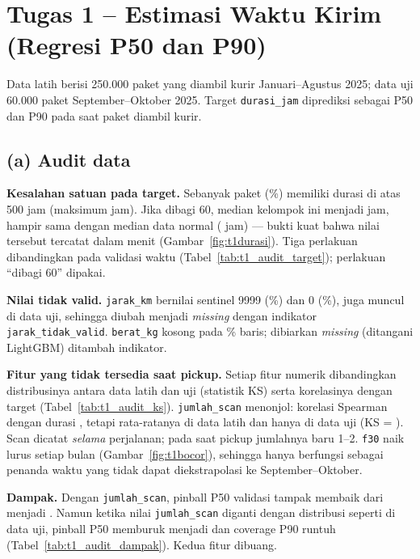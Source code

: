\section{Tugas 1 -- Estimasi Waktu Kirim (Regresi P50 dan P90)}
Data latih berisi 250.000 paket yang diambil kurir Januari--Agustus 2025; data uji 60.000 paket September--Oktober 2025.
Target \texttt{durasi\_jam} diprediksi sebagai P50 dan P90 pada saat paket diambil kurir.

\subsection*{(a) Audit data}
\textbf{Kesalahan satuan pada target.} Sebanyak \TsatuDurasiEkstremN{} paket (\TsatuDurasiEkstremPersen\%) memiliki durasi di atas 500 jam
(maksimum \TsatuDurasiMaks{} jam). Jika dibagi 60, median kelompok ini menjadi \TsatuMedianEkstremBagi{} jam, hampir sama dengan median
data normal (\TsatuMedianNormal{} jam) --- bukti kuat bahwa nilai tersebut tercatat dalam menit (Gambar~\ref{fig:t1durasi}).
Tiga perlakuan dibandingkan pada validasi waktu (Tabel~\ref{tab:t1_audit_target}); perlakuan ``dibagi 60'' dipakai.

\textbf{Nilai tidak valid.} \texttt{jarak\_km} bernilai sentinel 9999 (\TsatuJarakSentinelPersen\%) dan 0 (\TsatuJarakNolPersen\%),
juga muncul di data uji, sehingga diubah menjadi \textit{missing} dengan indikator \texttt{jarak\_tidak\_valid}.
\texttt{berat\_kg} kosong pada \TsatuBeratNAPersen\% baris; dibiarkan \textit{missing} (ditangani LightGBM) ditambah indikator.

\textbf{Fitur yang tidak tersedia saat pickup.} Setiap fitur numerik dibandingkan distribusinya antara data latih dan uji (statistik KS)
serta korelasinya dengan target (Tabel~\ref{tab:t1_audit_ks}). \texttt{jumlah\_scan} menonjol: korelasi Spearman dengan durasi
\TsatuScanSpearman{}, tetapi rata-ratanya \TsatuScanMeanTrain{} di data latih dan hanya \TsatuScanMeanTest{} di data uji (KS = \TsatuScanKS).
Scan dicatat \emph{selama} perjalanan; pada saat pickup jumlahnya baru 1--2. \texttt{f30} naik lurus setiap bulan (Gambar~\ref{fig:t1bocor}),
sehingga hanya berfungsi sebagai penanda waktu yang tidak dapat diekstrapolasi ke September--Oktober.

\textbf{Dampak.} Dengan \texttt{jumlah\_scan}, pinball P50 validasi tampak membaik dari \TsatuPinbalBersih{} menjadi \TsatuPinbalScan.
Namun ketika nilai \texttt{jumlah\_scan} diganti dengan distribusi seperti di data uji, pinball P50 memburuk menjadi \TsatuPinbalScanTest{}
dan coverage P90 runtuh (Tabel~\ref{tab:t1_audit_dampak}). Kedua fitur dibuang.


